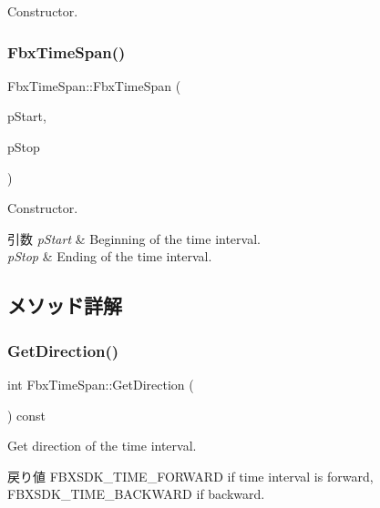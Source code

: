 Constructor. 

\mbox{\label{class_fbx_time_span_a50d9ebc7163501aafd108d80673c191b}} 
\subsubsection{\texorpdfstring{Fbx\+Time\+Span()}{FbxTimeSpan()}\hspace{0.1cm}{\footnotesize\ttfamily [2/2]}}
{\footnotesize\ttfamily Fbx\+Time\+Span\+::\+Fbx\+Time\+Span (\begin{DoxyParamCaption}\item[{\hyperlink{class_fbx_time}{Fbx\+Time}}]{p\+Start,  }\item[{\hyperlink{class_fbx_time}{Fbx\+Time}}]{p\+Stop }\end{DoxyParamCaption})}

Constructor. 
\begin{DoxyParams}{引数}
{\em p\+Start} & Beginning of the time interval. \\
\hline
{\em p\+Stop} & Ending of the time interval. \\
\hline
\end{DoxyParams}


\subsection{メソッド詳解}
\mbox{\label{class_fbx_time_span_ac53a2eda33c4e23da9417d0b76b67a54}} 
\subsubsection{\texorpdfstring{Get\+Direction()}{GetDirection()}}
{\footnotesize\ttfamily int Fbx\+Time\+Span\+::\+Get\+Direction (\begin{DoxyParamCaption}{ }\end{DoxyParamCaption}) const}

Get direction of the time interval. \begin{DoxyReturn}{戻り値}
{\ttfamily F\+B\+X\+S\+D\+K\+\_\+\+T\+I\+M\+E\+\_\+\+F\+O\+R\+W\+A\+RD} if time interval is forward, {\ttfamily F\+B\+X\+S\+D\+K\+\_\+\+T\+I\+M\+E\+\_\+\+B\+A\+C\+K\+W\+A\+RD} if backward. 
\end{DoxyReturn}
\mbox{\label{class_fbx_time_span_a292fce840a8caee4247157e24cbd787c}} 
